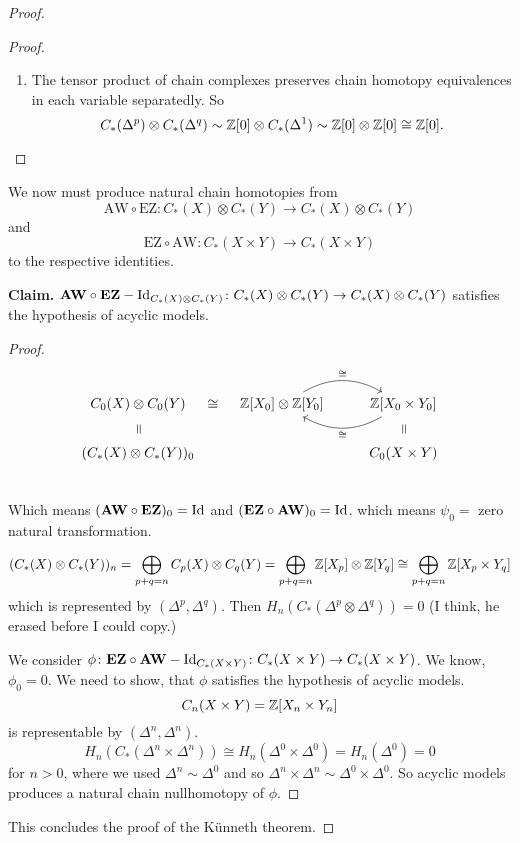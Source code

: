 \documentclass[language=english]{TemplateLecture}
\begin{document}
\begin{proof}
\begin{proof}
\begin{enumerate}
            \item The tensor product of chain complexes preserves chain homotopy equivalences in each variable separatedly. So
            \[C_*(\Delta^p) \otimes C_*(\Delta^q) \sim \mathbb{Z}[0] \otimes C_*(\Delta^1) \sim \mathbb{Z}[0] \otimes \mathbb{Z}[0] \cong \mathbb{Z}[0].\]
        \end{enumerate}
    \end{proof}

    We now must produce natural chain homotopies from
    \[\mathrm{AW} \circ \mathrm{EZ} \colon C_*(X) \otimes C_*(Y) \to C_*(X) \otimes C_*(Y)\]
    and
    \[\mathrm{EZ} \circ \mathrm{AW}: C_*(X\times Y) \to C_*(X \times Y)\]
    to the respective identities.

    \textbf{Claim.} \(\mathbf{AW}\circ \mathbf{EZ} - \operatorname{Id}_{C_*(X) \otimes C_*(Y)}\colon C_*(X) \otimes C_*(Y) \to C_*(X) \otimes C_*(Y)\) satisfies the hypothesis of acyclic models.

    \begin{proof}
        \[\begin{tikzcd}
            C_0(X) \otimes C_0(Y) \ar[d, phantom, "=", sloped]\ar[r,"\cong", phantom] & \IZ[X_0] \otimes \IZ[Y_0] \ar[r, bend left, "\cong"] & \IZ[X_0 \times Y_0] \ar[l, bend left, "\cong"] \ar[d, "=", phantom, sloped]\\
            (C_*(X) \otimes C_*(Y))_0 && C_0(X\times Y)\\
        \end{tikzcd}\]
        Which means \((\mathbf{AW} \circ \mathbf{EZ})_0 = \operatorname{Id}\) and \((\mathbf{EZ} \circ \mathbf{AW})_0 = \operatorname{Id}\). which means \(\psi_0 = \) zero natural transformation.

        \[(C_*(X) \otimes C_*(Y))_n = \bigoplus_{p+q = n} C_p(X) \otimes C_q(Y) = \bigoplus_{p+q = n} \mathbb{Z}[X_p] \otimes \mathbb{Z}[Y_q] \cong \bigoplus_{p+q = n} \mathbb{Z}[X_p \times Y_q]\]
        which is represented by \((\Delta^p, \Delta^q)\). Then
        \(H_n(C_*(\Delta^p \otimes \Delta^q)) = 0\) (I think, he erased before I could copy.)

        We consider \(\phi \colon \mathbf{EZ} \circ \mathbf{AW} - \operatorname{Id}_{C_*(X\times Y)} \colon C_*(X\times Y) \to C_*(X\times Y)\). We know, \(\phi_0 = 0\). We need to show, that \(\phi\) satisfies the hypothesis of acyclic models.
        \[C_n(X\times Y) = \mathbb{Z}[X_n \times Y_n]\]
        is representable by \((\Delta^n, \Delta^n)\).
        \[H_n(C_*(\Delta^n\times \Delta^n)) \cong H_n(\Delta^0 \times \Delta^0) = H_n(\Delta^0) = 0\]
        for \(n > 0\), where we used \(\Delta^n \sim \Delta^0\) and so \(\Delta^n \times \Delta^n \sim \Delta^0 \times \Delta^0\). So acyclic models produces a natural chain nullhomotopy of \(\phi\).
    \end{proof}

    This concludes the proof of the Künneth theorem.
\end{proof}
\end{document}

